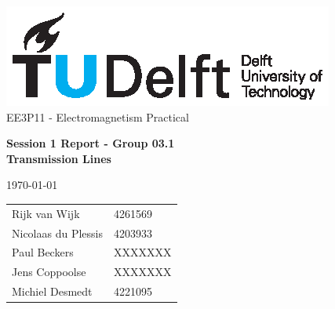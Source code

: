 \documentclass[11pt, a4paper, oneside]{article}
\begin{document}
\noindent
\begin{center}
	\includegraphics[width=\columnwidth]{tudelftlogo.eps} \\
	
	EE3P11 - Electromagnetism Practical\\
	\begin{LARGE}
		\textbf{Session 1 Report - Group 03.1 \\ Transmission Lines} \\[0.3cm]
	\end{LARGE}
	\today \\[.2cm]
	\begin{tabular}{l l}
		Rijk van Wijk & 4261569 \\
		Nicolaas du Plessis & 4203933 \\
		Paul Beckers & XXXXXXX \\
		Jens Coppoolse & XXXXXXX \\
		Michiel Desmedt & 4221095 \\
		
	\end{tabular}
\end{center}

	
	
	
	
	
\end{document}
